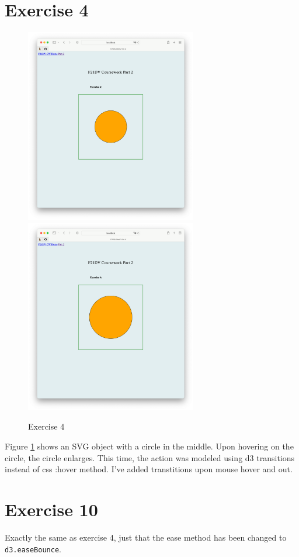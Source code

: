 \documentclass{scrreprt}
\begin{document}
\section{Exercise 4}
\begin{figure}[!ht]
    \centering
    \includegraphics[width = 7.5cm]{images/ex4_1.png}
    \includegraphics[width = 7.5cm]{images/ex4_2.png}
    \label{fig:ex4}
    \caption{Exercise 4}
\end{figure}
\FloatBarrier
% 
Figure \ref{fig:ex4} shows an SVG object with a circle in the middle. Upon hovering on the circle, the circle enlarges. This time, the action was modeled using d3 transitions instead of css :hover method. I've added transtitions upon mouse hover and out.
\section{Exercise 10}
Exactly the same as exercise 4, just that the ease method has been changed to \verb|d3.easeBounce|.
\end{document}
